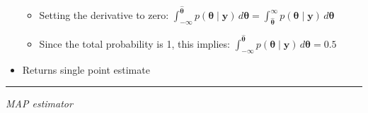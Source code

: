 \begin{itemize}
\begin{itemize}
        \item Setting the derivative to zero:
        $\int_{-\infty}^{\hat{\boldsymbol{\theta}}} p(\boldsymbol{\theta} \mid \boldsymbol{y}) \, d\boldsymbol{\theta} = \int_{\hat{\boldsymbol{\theta}}}^{\infty} p(\boldsymbol{\theta} \mid \boldsymbol{y}) \, d\boldsymbol{\theta}$
        \item Since the total probability is 1, this implies:
        $\int_{-\infty}^{\hat{\boldsymbol{\theta}}} p(\boldsymbol{\theta} \mid \boldsymbol{y}) \, d\boldsymbol{\theta} = 0.5$
    \end{itemize}
    \item Returns single point estimate
\end{itemize}

{\color{lightgray}\hrule height 0.001mm}

\emph{MAP estimator}

